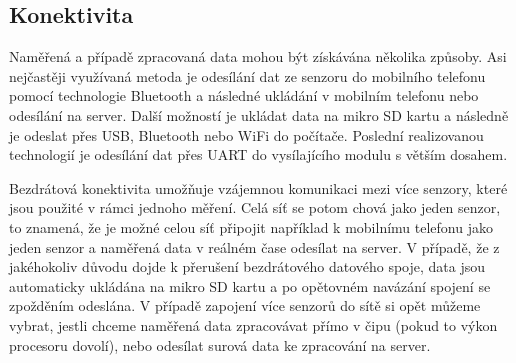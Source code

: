 \documentclass[12pt,a4paper]{article}
\begin{document}
\subsection{Konektivita}
Naměřená a případě zpracovaná data mohou být získávána několika způsoby. Asi nejčastěji využívaná metoda je odesílání dat ze senzoru do mobilního telefonu pomocí technologie Bluetooth a následné ukládání v mobilním telefonu nebo odesílání na server. Další možností je ukládat data na mikro SD kartu a následně je odeslat přes USB, Bluetooth nebo WiFi do počítače. Poslední realizovanou technologií je odesílání dat přes UART do vysílajícího modulu s větším dosahem.

Bezdrátová konektivita umožňuje vzájemnou komunikaci mezi více senzory, které jsou použité v rámci jednoho měření. Celá síť se potom chová jako jeden senzor, to znamená, že je možné celou síť připojit například k mobilnímu telefonu jako jeden senzor a naměřená data v reálném čase odesílat na server. V případě, že z jakéhokoliv důvodu dojde k přerušení bezdrátového datového spoje, data jsou automaticky ukládána na mikro SD kartu a po opětovném navázání spojení se zpožděním odeslána. V případě zapojení více senzorů do sítě si opět můžeme vybrat, jestli chceme naměřená data zpracovávat přímo v čipu (pokud to výkon procesoru dovolí), nebo odesílat surová data ke zpracování na server.
\end{document}
